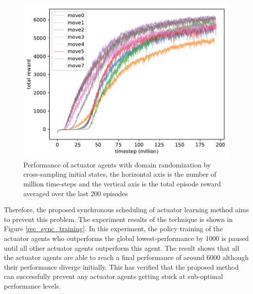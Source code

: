 \begin{figure}[!htbp]
	\includegraphics[width=\textwidth]{images/rec_180617_joint8.pdf}
	\centering
	\caption{Performance of actuator agents with domain randomization by cross-sampling initial states, the horizontal axis is the number of million time-steps and the vertical axis is the total episode reward averaged over the last 200 episodes}\label{rec_8task_training}
\end{figure}

Therefore, the proposed synchronous scheduling of actuator learning method aims to prevent this problem. The experiment results of the technique is shown in Figure \ref{rec_sync_training}. In this experiment, the policy training of the actuator agents who outperforms the global lowest-performance by 1000 is paused until all other actuator agents outperform this agent. The result shows that all the actuator agents are able to reach a final performance of around 6000 although their performance diverge initially. This has verified that the proposed method can successfully prevent any actuator agents getting stuck at sub-optimal performance levels. 

